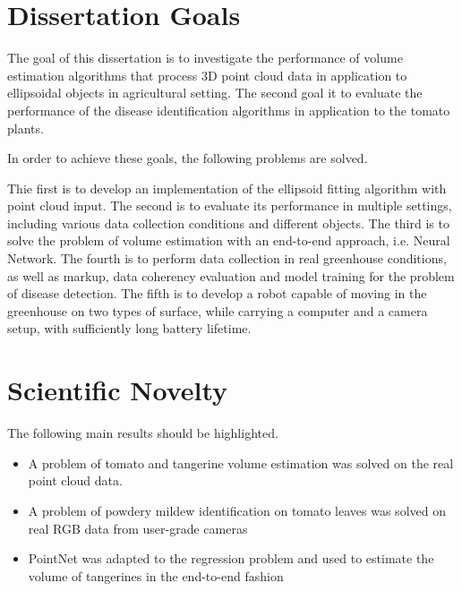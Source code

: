 \section{Dissertation Goals}

The goal of this dissertation is to investigate the performance of volume estimation algorithms that process 3D point cloud data in application to ellipsoidal objects in agricultural setting.
The second goal it to evaluate the performance of the disease identification algorithms in application to the tomato plants.

In order to achieve these goals, the following problems are solved.

Thie first is to develop an implementation of the ellipsoid fitting algorithm with point cloud input.
The second is to evaluate its performance in multiple settings, including various data collection conditions and different objects.
The third is to solve the problem of volume estimation with an end-to-end approach, i.e. Neural Network.
The fourth is to perform data collection in real greenhouse conditions, as well as markup, data coherency evaluation and model training for the problem of disease detection.
The fifth is to develop a robot capable of moving in the greenhouse on two types of surface, while carrying a computer and a camera setup, with sufficiently long battery lifetime.

\section{Scientific Novelty}

The following main results should be highlighted.

\begin{itemize}
    \item A problem of tomato and tangerine volume estimation was solved on the real point cloud data.
    \item A problem of powdery mildew identification on tomato leaves was solved on real RGB data from user-grade cameras
    \item PointNet was adapted to the regression problem and used to estimate the volume of tangerines in the end-to-end fashion

\end{itemize}

